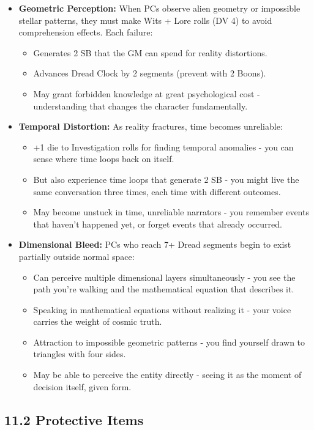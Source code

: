 \documentclass[11pt]{article}
\begin{document}
\begin{itemize}
\item \textbf{Geometric Perception:} When PCs observe alien geometry or impossible stellar patterns, they must make Wits + Lore rolls (DV 4) to avoid comprehension effects. Each failure:
\begin{itemize}
\item Generates 2 SB that the GM can spend for reality distortions.
\item Advances Dread Clock by 2 segments (prevent with 2 Boons).
\item May grant forbidden knowledge at great psychological cost - understanding that changes the character fundamentally.
\end{itemize}
\item \textbf{Temporal Distortion:} As reality fractures, time becomes unreliable:
\begin{itemize}
\item +1 die to Investigation rolls for finding temporal anomalies - you can sense where time loops back on itself.
\item But also experience time loops that generate 2 SB - you might live the same conversation three times, each time with different outcomes.
\item May become unstuck in time, unreliable narrators - you remember events that haven't happened yet, or forget events that already occurred.
\end{itemize}
\item \textbf{Dimensional Bleed:} PCs who reach 7+ Dread segments begin to exist partially outside normal space:
\begin{itemize}
\item Can perceive multiple dimensional layers simultaneously - you see the path you're walking and the mathematical equation that describes it.
\item Speaking in mathematical equations without realizing it - your voice carries the weight of cosmic truth.
\item Attraction to impossible geometric patterns - you find yourself drawn to triangles with four sides.
\item May be able to perceive the entity directly - seeing it as the moment of decision itself, given form.
\end{itemize}
\end{itemize}

\subsection*{11.2 Protective Items}
\end{document}
